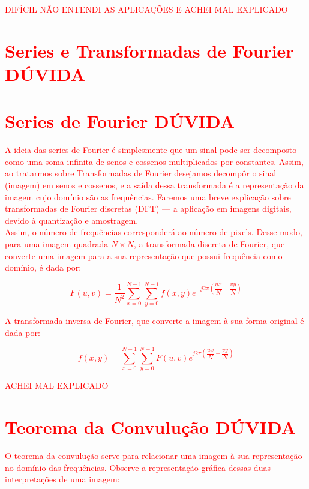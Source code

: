 \documentclass[a4paper, 12pt]{article}
\begin{document}
\textcolor{red}{\large{DIFÍCIL NÃO ENTENDI AS APLICAÇÕES E ACHEI MAL EXPLICADO}
\section{Series e Transformadas de Fourier \textcolor{red}{DÚVIDA}}
\section{Series de Fourier \textcolor{red}{DÚVIDA}}
A ideia das series de Fourier é simplesmente que um sinal pode ser decomposto como uma soma infinita de senos e cossenos multiplicados por constantes.
Assim, ao tratarmos sobre Transformadas de Fourier desejamos decompôr o sinal (imagem) em senos e cossenos, e a saída dessa transformada é a representação 
da imagem cujo domínio são as frequências. Faremos uma breve explicação sobre transformadas de Fourier discretas (DFT) --- a aplicação em imagens digitais, 
devido à quantização e amostragem.
\\
Assim, o número de frequências corresponderá ao número de pixels. Desse modo, para uma imagem quadrada $N \times N$, a transformada discreta de Fourier, 
que converte uma imagem para a sua representação que possui frequência como domínio, é dada por:
\begin{center}
	\[F(u,v) = \dfrac{1}{N^2} \sum_{x = 0}^{N-1} \sum_{y=0}^{N-1} f(x,y)e^{-j2\pi\left(\dfrac{ux}{N} + \dfrac{vy}{N}\right)}\]
\end{center}
A transformada inversa de Fourier, que converte a imagem à sua forma original é dada por:
\begin{center}
	\[f(x,y) = \sum_{x = 0}^{N-1} \sum_{y=0}^{N-1} F(u,v)e^{j2\pi\left(\dfrac{ux}{N} + \dfrac{vy}{N}\right)}\]
\end{center}
}
\textcolor{red}{\large{ACHEI MAL EXPLICADO}
\section{Teorema da Convulução \textcolor{red}{DÚVIDA}}
O teorema da convulução serve para relacionar uma imagem à sua representação no domínio das frequências. Observe a representação gráfica dessas duas 
interpretações de uma imagem:}
\end{document}

